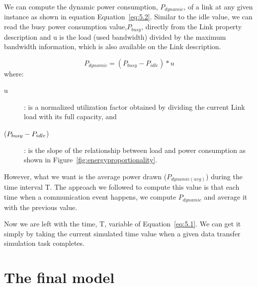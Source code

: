 We can compute the dynamic power consumption, \(P_{dynamic}\), of a link at any given instance as shown in equation Equation~\ref{eq:5.2}. Similar to the idle value, we can read the busy power consumption value,\(P_{busy}\), directly from the 
Link property description and u is the load (used bandwidth) divided by the maximum bandwidth information, which is also available on the Link description. 

\begin{equation} \label{eq:5.2}
P_{dynamic} = (P_{busy} - P_{idle}) * u 
\end{equation} 
where:
\begin{description}
    \item [u]: is a normalized utilization factor obtained by dividing the current Link load with its full capacity, and 
    \item [(\($$P_{busy} - P_{idle}$$\))]: is the slope of the relationship between load and power consumption as shown in Figure~\ref{fig:energyproportionality}.
\end{description} 

However, what we want is the average power drawn (\(P_{dynamic (avg)}\))  during the time interval T.  The approach we followed to compute this value is that each time when a communication event happens, we compute \(P_{dynamic}\) and average it with the previous value. 

Now we are left with the time, T, variable of Equation~\ref{eq:5.1}. We can get it simply by taking the current simulated time value when a given data transfer simulation task completes. 


 
\section{The final model}

